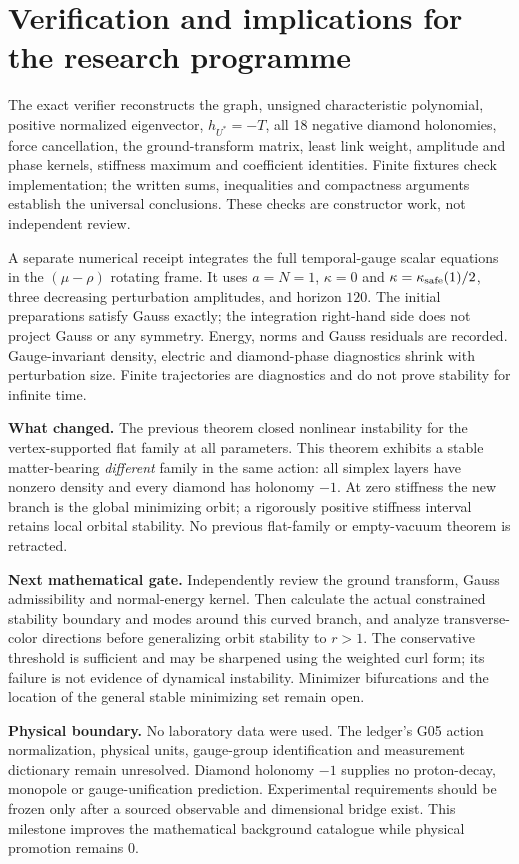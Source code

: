 \documentclass[11pt,a4paper]{article}
\begin{document}
\newpage
\section{Verification and implications for the research programme}
The exact verifier reconstructs the graph, unsigned characteristic polynomial, positive normalized eigenvector, $h_{U^*}=-T$, all 18 negative diamond holonomies, force cancellation, the ground-transform matrix, least link weight, amplitude and phase kernels, stiffness maximum and coefficient identities. Finite fixtures check implementation; the written sums, inequalities and compactness arguments establish the universal conclusions. These checks are constructor work, not independent review.

A separate numerical receipt integrates the full temporal-gauge scalar equations in the $(\mu-\rho)$ rotating frame. It uses $a=N=1$, $\kappa=0$ and $\kappa=\kappa_{\rm safe}(1)/2$, three decreasing perturbation amplitudes, and horizon $120$. The initial preparations satisfy Gauss exactly; the integration right-hand side does not project Gauss or any symmetry. Energy, norms and Gauss residuals are recorded. Gauge-invariant density, electric and diamond-phase diagnostics shrink with perturbation size. Finite trajectories are diagnostics and do not prove stability for infinite time.

\textbf{What changed.} The previous theorem closed nonlinear instability for the vertex-supported flat family at all parameters. This theorem exhibits a stable matter-bearing \emph{different} family in the same action: all simplex layers have nonzero density and every diamond has holonomy $-1$. At zero stiffness the new branch is the global minimizing orbit; a rigorously positive stiffness interval retains local orbital stability. No previous flat-family or empty-vacuum theorem is retracted.

\textbf{Next mathematical gate.} Independently review the ground transform, Gauss admissibility and normal-energy kernel. Then calculate the actual constrained stability boundary and modes around this curved branch, and analyze transverse-color directions before generalizing orbit stability to $r>1$. The conservative threshold is sufficient and may be sharpened using the weighted curl form; its failure is not evidence of dynamical instability. Minimizer bifurcations and the location of the general stable minimizing set remain open.

\textbf{Physical boundary.} No laboratory data were used. The ledger's G05 action normalization, physical units, gauge-group identification and measurement dictionary remain unresolved. Diamond holonomy $-1$ supplies no proton-decay, monopole or gauge-unification prediction. Experimental requirements should be frozen only after a sourced observable and dimensional bridge exist. This milestone improves the mathematical background catalogue while physical promotion remains $0$.
\end{document}
